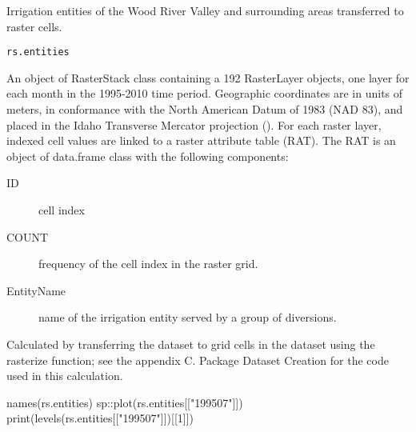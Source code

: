 \documentclass[a4paper]{book}
\begin{document}
%
\begin{Description}\relax
Irrigation entities of the Wood River Valley and surrounding areas transferred to raster cells.
\end{Description}
%
\begin{Usage}
\begin{verbatim}
rs.entities
\end{verbatim}
\end{Usage}
%
\begin{Format}
An object of RasterStack class containing a 192 RasterLayer objects,
one layer for each month in the 1995-2010 time period.
Geographic coordinates are in units of meters, in conformance with the
North American Datum of 1983 (NAD 83), and placed in the
Idaho Transverse Mercator projection ().
For each raster layer, indexed cell values are linked to a raster attribute table (RAT).
The RAT is an object of data.frame class with the following components:
\begin{description}

\item[ID] cell index
\item[COUNT] frequency of the cell index in the raster grid.
\item[EntityName] name of the irrigation entity served by a group of diversions.

\end{description}
\end{Format}
%
\begin{Source}\relax
Calculated by transferring the  dataset to grid cells
in the  dataset using the rasterize function;
see the appendix C. Package Dataset Creation for the \R{} code used in this calculation.
\end{Source}
%
\begin{Examples}
\begin{ExampleCode}
names(rs.entities)
sp::plot(rs.entities[["199507"]])
print(levels(rs.entities[["199507"]])[[1]])

\end{ExampleCode}
\end{Examples}
%
\end{document}

